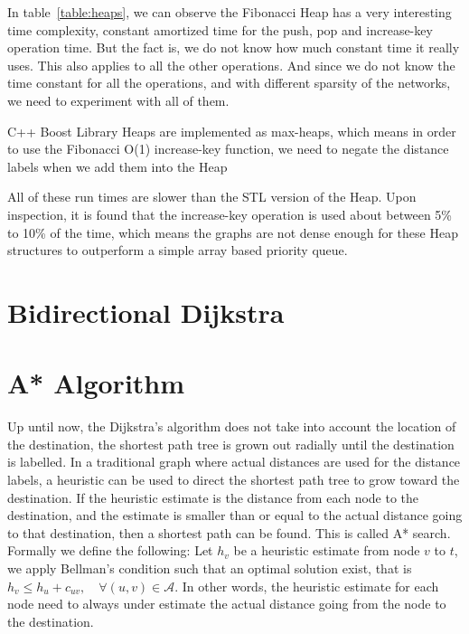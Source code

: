 \begin{comment}
Thus we change Step 2 of the GSP
\begin{verbatim}
Step 2: Label update
if u is not a zone node then
for each outgoing arc (u,v) \in \mathcal{A} do
if d_u + c_{uv} < d_v then
d_v := du + c_{uv}
p_v := u
if v \notin Q then
add v to Q
else
decrease-key(v)
end if
end for
end if
\end{verbatim}
\end{comment}

In table~\ref{table:heaps},
we can observe the Fibonacci Heap has a very interesting time complexity,
constant amortized time for the push, pop and increase-key operation time.
But the fact is,
we do not know how much constant time it really uses.
This also applies to all the other operations.
And since we do not know the time constant for all the operations,
and with different sparsity of the networks,
we need to experiment with all of them.

C++ Boost Library Heaps are implemented as max-heaps,
which means in order to use the Fibonacci O(1) increase-key function,
we need to negate the distance labels when we add them into the Heap

All of these run times are slower than the STL version of the Heap.
Upon inspection,
it is found that the increase-key operation is used about between 5\% to 10\%
of the time,
which means the graphs are not dense enough for these Heap structures to outperform a
simple array based priority queue.

\section{Bidirectional Dijkstra}
\section{A* Algorithm}
Up until now,
the Dijkstra's algorithm does not take into account the location of the destination,
the shortest path tree is grown out radially until the destination is labelled.
In a traditional graph where actual distances are used for the distance labels,
a heuristic can be used to direct the shortest path tree to grow toward the destination.
If the heuristic estimate is the distance from each node to the destination,
and the estimate is smaller than or equal to the actual distance going to that destination,
then a shortest path can be found. This is called A* search.
Formally we define the following: Let $h_v$ be a heuristic estimate from node $v$ to $t$,
we apply Bellman's condition such that an optimal solution exist, that is 
$ h_v \leq h_u + c_{uv}, \quad \forall(u,v) \in \mathcal{A} $.
In other words, the heuristic estimate for each node need to always under estimate the actual distance going from the node to the destination.

